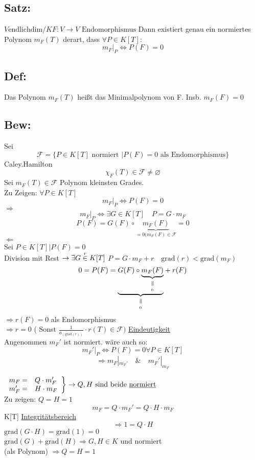 \documentclass[titlepage,12pt,a4paper,ngerman]{report}
\newcommand{\verteq}{\rotatebox{90}{$\,=$}}
\newcommand{\equalto}[2]{\underset{\scriptstyle\overset{\mkern4mu\verteq}{#2}}{#1}}
\newcommand{\tx}[1]{\textrm{#1}}
\newcommand{\ub}[1]{\underbrace{#1}}
\newcommand{\grad}{\tx{grad}}
\newcommand{\enph}{F: V \to V \textrm{ Endomorphismus}}
\begin{document}
\subsection{Satz:}
$ V \tx{endlichdim} / K \enph$
Dann existiert genau ein normiertes Polynom $m_F(T)$ derart, dass $\forall P\in K[T]$:
$$ m_F|_P \Leftrightarrow P(F) = 0$$
\subsection{Def:}
Das Polynom $m_F(T)$ heißt das Minimalpolynom von F. Insb. $m_F(F) = 0$
\subsection{Bew:} Sei $$\mathcal{F} = \{ P\in K[T] \tx{ normiert } |P(F) = 0 \tx{ als Endomorphismus}\}$$
Caley.Hamilton
$$\chi_F(T) \in \mathcal{F} \neq \varnothing$$
Sei $m_F(T) \in \mathcal{F}$ Polynom kleinsten Grades.\\
Zu Zeigen: $\forall P\in K[T]$
$$m_F|_P \Leftrightarrow P(F) = 0$$
$\Rightarrow$\\
$$m_F|_P \Leftrightarrow \exists G \in K[T] \quad P = G \cdot m_F$$
$$ P(F) = G(F) \circ \ub{m_F(F)}_{= 0 (m_F(F) \in \mathcal{F}} = 0$$
$\Leftarrow$\\
Sei $P \in K[T] | P(F) = 0$\\
Division mit Rest $\rightarrow \exists G \buildrel r \over \in K[T]$
$ P = G \cdot m_F + r \quad \grad(r) < \grad(m_F)$
$$0=P(F) = \equalto{\ub{G(F) \circ \equalto{\ub{m_F(F)}}{_{0}}}}{_{ 0}} + r(F)$$
$\Rightarrow r(F) = 0$ als Endomorphismus\\
$ \Rightarrow r = 0$ ( Sonst $\frac{1}{a_{(\grad(r))}} \cdot r(T) \in \mathcal{F})$
\underline{Eindeutigkeit}\\
Angenommen $m_F'$ ist normiert. wäre auch so:
$$m_F'|_P \Leftrightarrow P(F) = 0 \forall P \in K[T]$$
$$\Rightarrow m_F|_{m_F'} \quad \& \quad m_F'|_{m_F}$$ 

$\left. \begin{array}{ll}
m_F = & Q \cdot m_F' \\
m_F' = & H \cdot m_F
\end{array} \right\} \rightarrow Q,H \tx{ sind beide \underline{normiert}} $\\[10pt]
Zu zeigen: \underline{$Q=H=1$}
$$m_F = Q \cdot m_F' = Q \cdot H \cdot m_F$$
K[T] \underline{Integritätsbereich}
$$ \Rightarrow 1 = Q \cdot H$$
$\grad(G\cdot H) = \grad (1) = 0$\\
$\grad(G) + \grad(H) \Rightarrow G,H \in K $ und normiert\\
(als Polynom) $\Rightarrow Q = H = 1$
\end{document}
